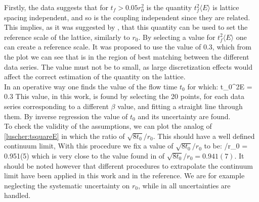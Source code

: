 Firstly, the data suggests that for $t_f > 0.05r_0^2$ is the quantity $t_f^2\langle E \rangle$ is lattice spacing independent, and so is the coupling independent since they are related. This implies, as it was suggested by \cite{luscher_properties_2010}, that this quantity can be used to set the reference scale of the lattice, similarly to $r_0$. By selecting a value for $t_f^2\langle E \rangle$ one can create a reference scale. It was proposed to use the value of $0.3$, which from the plot we can see that is in the region of best matching between the different data series. The value must not be to small, as large discretization effects would affect the correct estimation of the quantity on the lattice.\\
In an operative way one finds the value of the flow time $t_0$ for which:
\beq
    t_0^2\langle E \rangle = 0.3
\eeq
This value, in this work, is found by selecting the 20 points, for each data series corresponding to a different $\beta$ value, and fitting a straight line through them. By inverse regression the value of $t_0$ and its uncertainty are found.\\
To check the validity of the assumptions, we can plot the analog of \cref{luscher:tsquareE} in which the ratio of $\sqrt{8t_0}/r_0$. This should have a well defined continuum limit, 
With this procedure we fix a value of $\sqrt{8t_0}/r_0$ to be:
\beq
{}/r_0 = 0.951(5)
\eeq 
which is very close to the value found in \cite{ce_non-gaussianities_2015} of $\sqrt{8t_0}/r_0 = 0.941(7)$. It should be noted however that different procedures to extrapolate the continuum limit have been applied in this work and in the reference. We are for example neglecting the systematic uncertainty on $r_0$, while in \cite{ce_non-gaussianities_2015} all uncertainties are handled.
 
